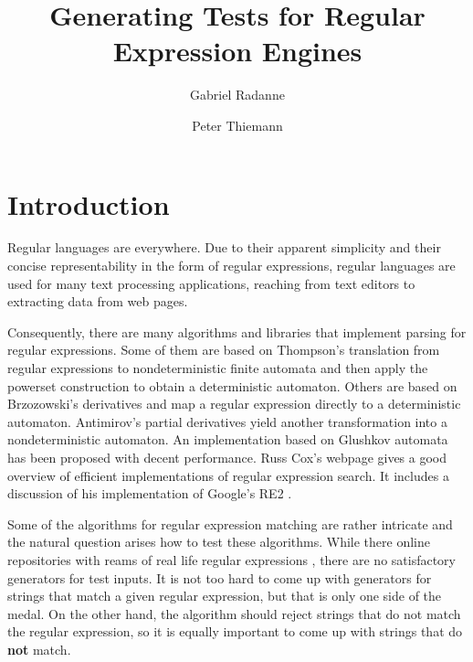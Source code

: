 \documentclass{llncs}
\begin{document}
\title{Generating Tests for Regular Expression Engines}

\author{Gabriel Radanne \and Peter Thiemann}
% 



\maketitle

\begin{abstract}
  
\end{abstract}

\section{Introduction}

Regular languages are everywhere. Due to their apparent simplicity and
their concise representability in the form of regular expressions,
regular languages are used for many text processing
applications, reaching from text editors
\cite{DBLP:journals/cacm/Thompson68} to extracting data from web
pages.

Consequently, there are many algorithms and libraries that implement
parsing for regular expressions. Some of them are based on Thompson's
translation from regular expressions to nondeterministic finite
automata and then apply the powerset construction to obtain a
deterministic automaton. Others are based on Brzozowski's derivatives
\cite{Brzozowski1964} and
map a regular expression directly to a deterministic
automaton. Antimirov's partial derivatives \cite{Antimirov96Partial}
yield another transformation into a nondeterministic automaton. An
implementation based on Glushkov automata has been proposed
\cite{DBLP:conf/icfp/FischerHW10} with decent performance.
Russ Cox's webpage gives a good overview
of efficient implementations of regular expression search. It includes
a discussion of his implementation of Google's RE2 \cite{cox10:_regul_expres_match_wild}.

Some of the algorithms for regular expression matching are rather
intricate and the natural question arises how to test these algorithms. 
While there online repositories with reams of real life regular
expressions \cite{regul_expres_librar}, there are no satisfactory
generators for test inputs. It is not too hard to come up with
generators for strings that match a given regular expression, but that
is only one side of the medal. On the other hand, the algorithm should
reject strings that do not match the regular expression, so it is
equally important to come up with strings that do \textbf{not} match.
\end{document}
